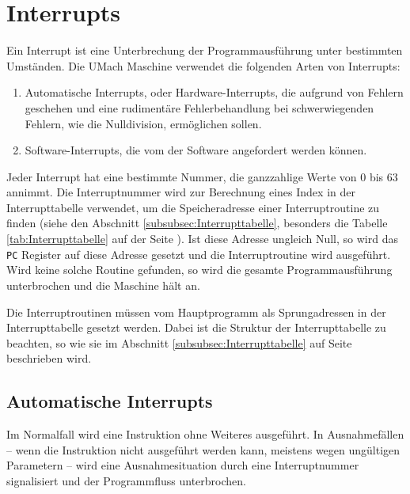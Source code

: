 \section{Interrupts}
\label{sec:Interrupts}

Ein Interrupt ist eine Unterbrechung der Programmausführung unter bestimmten
Umständen. Die UMach Maschine verwendet die folgenden Arten von Interrupts:

\begin{enumerate}
 \item Automatische Interrupts, oder Hardware-Interrupts, die aufgrund von
       Fehlern geschehen und eine rudimentäre Fehlerbehandlung bei
       schwerwiegenden Fehlern, wie die Nulldivision, ermöglichen sollen.
 \item Software-Interrupts, die vom der Software angefordert
       werden können.
\end{enumerate}

Jeder Interrupt hat eine bestimmte Nummer, die ganzzahlige Werte von 0 bis 63
annimmt. Die Interruptnummer wird zur Berechnung eines Index in der
Interrupttabelle verwendet, um die Speicheradresse einer Interruptroutine zu
finden (siehe den Abschnitt \ref{subsubsec:Interrupttabelle}, besonders die
Tabelle \ref{tab:Interrupttabelle} auf der Seite
\pageref{tab:Interrupttabelle}). Ist diese Adresse ungleich Null, so wird das
\texttt{PC} Register auf diese Adresse gesetzt und die Interruptroutine wird
ausgeführt. Wird keine solche Routine gefunden, so wird die gesamte
Programmausführung unterbrochen und die Maschine hält an.

Die Interruptroutinen müssen vom Hauptprogramm als Sprungadressen in der
Interrupttabelle gesetzt werden. Dabei ist die Struktur der Interrupttabelle zu
beachten, so wie sie im Abschnitt \ref{subsubsec:Interrupttabelle} auf Seite
\pageref{subsubsec:Interrupttabelle} beschrieben wird.



\subsection{Automatische Interrupts}

Im Normalfall wird eine Instruktion ohne Weiteres ausgeführt. In Ausnahmefällen
-- wenn die Instruktion nicht ausgeführt werden kann, meistens wegen ungültigen
Parametern -- wird eine Ausnahmesituation durch eine
Interruptnummer signalisiert und der Programmfluss unterbrochen.




